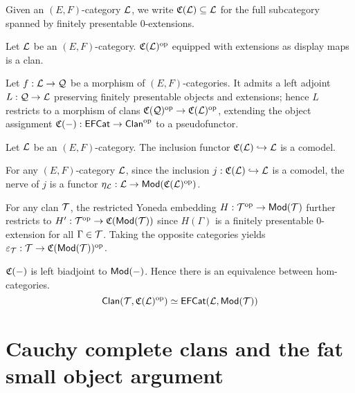 \documentclass[a4paper]{article}
\begin{document}
\begin{definition}
  Given an $(E,F)$-category $\mathcal{L}$, we write $\mathfrak{C}(\mathcal{L}) \subseteq \mathcal{L}$ for the full subcategory spanned by finitely presentable $0$-extensions.
\end{definition}

\begin{lemma}
  Let $\mathcal{L}$ be an $(E,F)$-category.
  $\mathfrak{C}(\mathcal{L})^{\mathrm{op}}$ equipped with extensions as display maps is a clan.
\end{lemma}

\begin{construction}
  Let $f : \mathcal{L} \to \mathcal{Q}$ be a morphism of $(E,F)$-categories.
  It admits a left adjoint $L : \mathcal{Q} \to \mathcal{L}$ preserving finitely presentable objects and extensions; hence $L$ restricts to a morphism of clans $\mathfrak{C}(\mathcal{Q})^{\mathrm{op}} \to \mathfrak{C}(\mathcal{L})^{\mathrm{op}}$, extending the object assignment $\mathfrak{C}(-) : \mathsf{EFCat} \to \mathsf{Clan}^{\mathrm{op}}$ to a pseudofunctor.
\end{construction}

\begin{lemma}
  Let $\mathcal{L}$ be an $(E,F)$-category.
  The inclusion functor $\mathfrak{C}(\mathcal{L}) \hookrightarrow \mathcal{L}$ is a comodel.
\end{lemma}

\begin{construction}
  For any $(E,F)$-category $\mathcal{L}$, since the inclusion $j : \mathfrak{C}(\mathcal{L}) \hookrightarrow \mathcal{L}$ is a comodel, the nerve of $j$ is a functor $\eta_{\mathcal{L}} : \mathcal{L} \to \mathsf{Mod}(\mathfrak{C}(\mathcal{L})^{\mathrm{op}})$.
\end{construction}

\begin{construction}
  For any clan $\mathcal{T}$, the restricted Yoneda embedding $H : \mathcal{T}^{\mathrm{op}} \to \mathsf{Mod}(\mathcal{T})$ further restricts to $H' : \mathcal{T}^{\mathrm{op}} \to \mathfrak{C}(\mathsf{Mod}(\mathcal{T}))$ since $H(\Gamma)$ is a finitely presentable 0-extension for all $\Gamma \in \mathcal{T}$.
  Taking the opposite categories yields $\varepsilon_{\mathcal{T}} : \mathcal{T} \to \mathfrak{C}(\mathsf{Mod}(\mathcal{T}))^{\mathrm{op}}$.
\end{construction}

\begin{theorem}
  $\mathfrak{C}(-)$ is left biadjoint to $\mathsf{Mod}(-)$.
  Hence there is an equivalence between hom-categories.
  \[
    \mathsf{Clan}(\mathcal{T},\mathfrak{C}(\mathcal{L})^{\mathrm{op}}) \simeq \mathsf{EFCat}(\mathcal{L},\mathsf{Mod}(\mathcal{T}))
  \]
\end{theorem}

\section{Cauchy complete clans and the fat small object argument}
\end{document}
